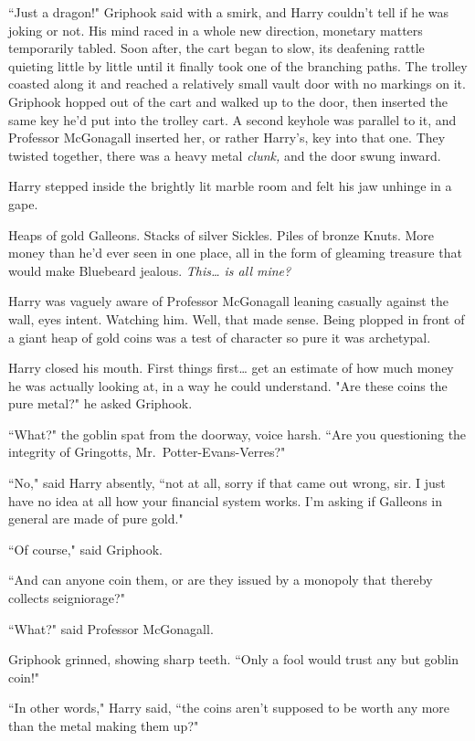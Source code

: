 ``Just a dragon!" Griphook said with a smirk, and Harry couldn't tell if he was joking or not. His mind raced in a whole new direction, monetary matters temporarily tabled. Soon after, the cart began to slow, its deafening rattle quieting little by little until it finally took one of the branching paths. The trolley coasted along it and reached a relatively small vault door with no markings on it. Griphook hopped out of the cart and walked up to the door, then inserted the same key he'd put into the trolley cart. A second keyhole was parallel to it, and Professor McGonagall inserted her, or rather Harry's, key into that one. They twisted together, there was a heavy metal \emph{clunk,} and the door swung inward.

Harry stepped inside the brightly lit marble room and felt his jaw unhinge in a gape.

Heaps of gold Galleons. Stacks of silver Sickles. Piles of bronze Knuts. More money than he'd ever seen in one place, all in the form of gleaming treasure that would make Bluebeard jealous. \emph{This{\ldots} is all mine?}

Harry was vaguely aware of Professor McGonagall leaning casually against the wall, eyes intent. Watching him. Well, that made sense. Being plopped in front of a giant heap of gold coins was a test of character so pure it was archetypal.

Harry closed his mouth. First things first{\ldots} get an estimate of how much money he was actually looking at, in a way he could understand. "Are these coins the pure metal?" he asked Griphook.

``What?" the goblin spat from the doorway, voice harsh. ``Are you questioning the integrity of Gringotts, Mr.~Potter-Evans-Verres?"

``No," said Harry absently, ``not at all, sorry if that came out wrong, sir. I just have no idea at all how your financial system works. I'm asking if Galleons in general are made of pure gold."

``Of course," said Griphook.

``And can anyone coin them, or are they issued by a monopoly that thereby collects seigniorage?"

``What?" said Professor McGonagall.

Griphook grinned, showing sharp teeth. ``Only a fool would trust any but goblin coin!"

``In other words," Harry said, ``the coins aren't supposed to be worth any more than the metal making them up?"

